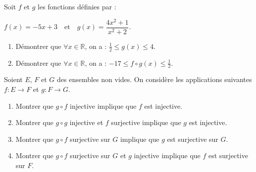 \documentclass[12pt]{article}
\begin{document}

\bigskip

Soit \( f \) et \( g \) les fonctions définies par :  

\( f(x) = -5x + 3 \quad \text{et} \quad g(x) = \dfrac{4x^2 + 1}{x^2 + 2}. \)

\begin{enumerate}
    \item Démontrer que \( \forall x \in \mathbb{R} \), on a :  
\( \frac{1}{2} \leq g(x) \leq 4. \)
    \item Démontrer que \( \forall x \in \mathbb{R} \), on a :  
    \(  -17 \leq f \circ g(x) \leq \frac{1}{2}. \)
\end{enumerate}

\bigskip


\bigskip

Soient \( E \), \( F \) et \( G \) des ensembles non vides. On considère les applications suivantes  
\( f : E \to F \) et \( g : F \to G \).

\begin{enumerate}
    \item Montrer que \( g \circ f \) injective implique que \( f \) est injective.
    \item Montrer que \( g \circ g \) injective et \( f \) surjective implique que \( g \) est injective.
    \item Montrer que \( g \circ f \) surjective sur \( G \) implique que \( g \) est surjective sur \( G \).
    \item Montrer que \( g \circ f \) surjective sur \( G \) et \( g \) injective implique que \( f \) est surjective sur \( F \).
\end{enumerate}
\end{document}
